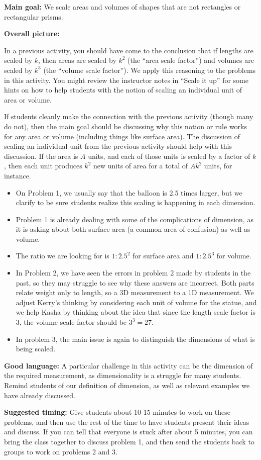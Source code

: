 \documentclass[nooutcomes, noauthor, handout]{ximera}
\begin{document}
\begin{instructorNotes}

{\bf Main goal:} We scale areas and volumes of shapes that are not rectangles or rectangular prisms.


{\bf Overall picture:} 

In a previous activity, you should have come to the conclusion that if lengths are scaled by $k$, then areas are scaled by $k^2$ (the ``area scale factor'') and volumes are scaled by $k^3$ (the ``volume scale factor'').  We apply this reasoning to the problems in this activity. You might review the instructor notes in ``Scale it up'' for some hints on how to help students with the notion of scaling an individual unit of area or volume.

If students cleanly make the connection with the previous activity (though many do not), then the main goal should be discussing why this notion or rule works for any area or volume  (including things like surface area).  The discussion of scaling an individual unit from the previous activity should help with this discussion.  If the area is $A$ units, and each of those units is scaled by a factor of $k$, then each unit produces $k^2$ new units of area for a total of $Ak^2$ units, for instance.


\begin{itemize}
	\item On Problem 1, we usually say that the balloon is 2.5 times larger, but we clarify to be sure students realize this scaling is happening in each dimension. 
	\item Problem 1 is already dealing with some of the complications of dimension, as it is asking about both surface area (a common area of confusion) as well as volume.
	\item The ratio we are looking for is $1:2.5^2$ for surface area and $1:2.5^3$ for volume.
	\item In Problem 2, we have seen the errors in problem 2 made by students in the past, so they may struggle to see why these answers are incorrect. Both parts relate weight only to length, so a 3D measurement to a 1D measurement. We adjust Kerry's thinking by considering each unit of volume for the statue, and we help Kasha by thinking about the idea that since the length scale factor is $3$, the volume scale factor should be $3^3=27$.
	\item In problem 3, the main issue is again to distinguish the dimensions of what is being scaled.
\end{itemize}

{\bf Good language:} A particular challenge in this activity can be the dimension of the required measurement, as dimensionality is a struggle for many students. Remind students of our definition of dimension, as well as relevant examples we have already discussed.


{\bf Suggested timing:} Give students about 10-15 minutes to work on these problems, and then use the rest of the time to have students present their ideas and discuss.  If you can tell that everyone is stuck after about 5 minutes, you can bring the class together to discuss problem 1, and then send the students back to groups to work on problems 2 and 3.
\end{instructorNotes}
\end{document}
